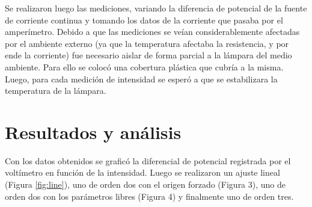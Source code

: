 \documentclass[twoside,twocolumn,a4paper]{article}
\begin{document}
Se realizaron luego las mediciones, variando la diferencia de potencial de la fuente de corriente continua y tomando los datos de la corriente que pasaba por el amper\'imetro. Debido a que las mediciones se ve\'ian considerablemente afectadas por el ambiente externo (ya que la temperatura afectaba la resistencia, y por ende la corriente) fue necesario aislar de forma parcial a la l\'ampara del medio ambiente. Para ello se coloc\'o una cobertura pl\'astica que cubr\'ia a la misma. Luego, para cada medici\'on de intensidad se esper\'o a que se estabilizara la temperatura de la l\'ampara.\par

\section{Resultados y an\'alisis}

Con los datos obtenidos se grafic\'o la diferencial de potencial registrada por el volt\'imetro en funci\'on de la intensidad. Luego se realizaron un ajuste lineal (Figura \ref{fig:line}), uno de orden dos con el origen forzado (Figura 3), uno de orden dos con los par\'ametros libres (Figura 4) y finalmente uno de orden tres.\par
\end{document}
